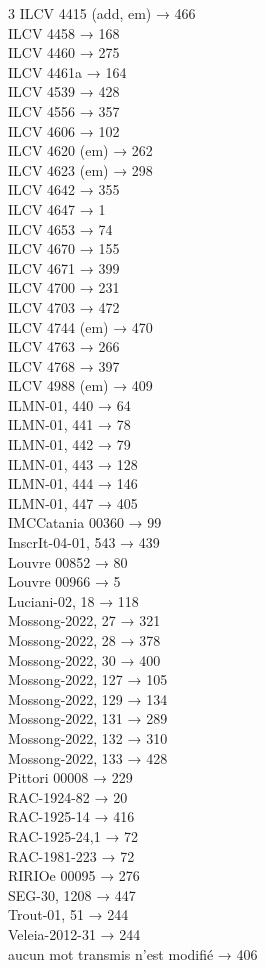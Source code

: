 \begin{multicols}{3}
ILCV 4415 (add, em) → 466\\
ILCV 4458 → 168\\
ILCV 4460 → 275\\
ILCV 4461a → 164\\
ILCV 4539 → 428\\
ILCV 4556 → 357\\
ILCV 4606 → 102\\
ILCV 4620 (em) → 262\\
ILCV 4623 (em) → 298\\
ILCV 4642 → 355\\
ILCV 4647 → 1\\
ILCV 4653 → 74\\
ILCV 4670 → 155\\
ILCV 4671 → 399\\
ILCV 4700 → 231\\
ILCV 4703 → 472\\
ILCV 4744 (em) → 470\\
ILCV 4763 → 266\\
ILCV 4768 → 397\\
ILCV 4988 (em) → 409\\
ILMN-01, 440 → 64\\
ILMN-01, 441 → 78\\
ILMN-01, 442 → 79\\
ILMN-01, 443 → 128\\
ILMN-01, 444 → 146\\
ILMN-01, 447 → 405\\
IMCCatania 00360 → 99\\
InscrIt-04-01, 543 → 439\\
Louvre 00852 → 80\\
Louvre 00966 → 5\\
Luciani-02, 18 → 118\\
Mossong-2022, 27 → 321\\
Mossong-2022, 28 → 378\\
Mossong-2022, 30 → 400\\
Mossong-2022, 127 → 105\\
Mossong-2022, 129 → 134\\
Mossong-2022, 131 → 289\\
Mossong-2022, 132 → 310\\
Mossong-2022, 133 → 428\\
Pittori 00008 → 229\\
RAC-1924-82 → 20\\
RAC-1925-14 → 416\\
RAC-1925-24,1 → 72\\
RAC-1981-223 → 72\\
RIRIOe 00095 → 276\\
SEG-30, 1208 → 447\\
Trout-01, 51 → 244\\
Veleia-2012-31 → 244\\
aucun mot transmis n’est modifié → 406\end{multicols}
